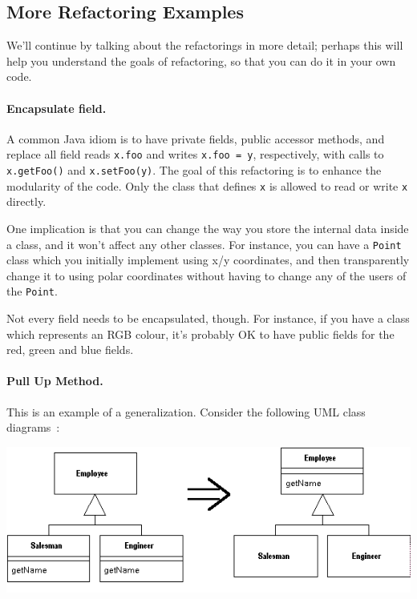\subsection*{More Refactoring Examples} 
\vspace{-1.5em}
We'll continue by talking about the
refactorings in more detail; perhaps this will help you understand the
goals of refactoring, so that you can do it in your own code.

\paragraph{Encapsulate field.} A common Java idiom is to have private fields,
public accessor methods, and replace all field reads {\tt x.foo} and
writes {\tt x.foo = y}, respectively, with calls to {\tt x.getFoo()}
and {\tt x.setFoo(y)}. The goal of this refactoring is to enhance the modularity of the code. Only the class that defines {\tt x} is allowed to read or write {\tt x}
directly. 

One implication is that you can change the way you store the internal
data inside a class, and it won't affect any other classes. For instance,
you can have a {\tt Point} class which you initially implement using 
x/y coordinates, and then transparently change it to using polar
coordinates without having to change any of the users of the {\tt Point}. 

Not every field needs to be encapsulated, though. For instance, if you 
have a class which represents an RGB colour, it's probably OK to have 
public fields for the red, green and blue fields.


\paragraph{Pull Up Method.} This is an example of a 
generalization. Consider the following UML class diagrams~\cite{ref:pullup}:

\begin{center}
\includegraphics[width=\textwidth]{images/pullUpMethod.png}
\end{center}

